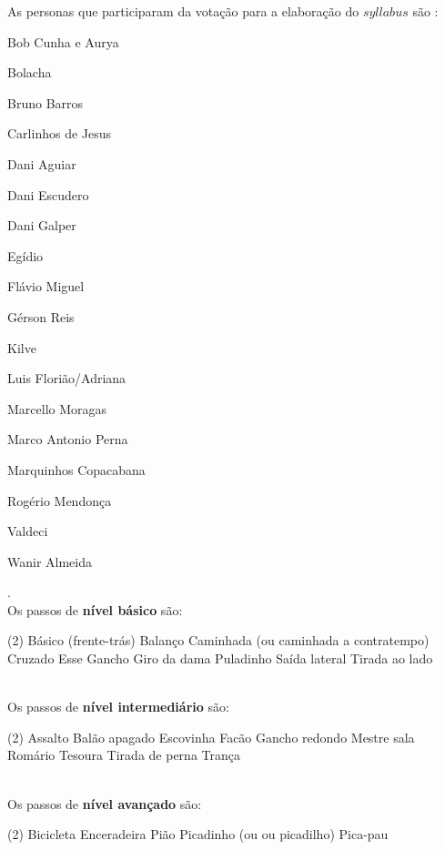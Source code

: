 As personas que participaram da votação para a elaboração do $syllabus$ são \cite[pp. 144]{perna2002samba}:
\begin{inparaitem}[$*$]
\item Bob Cunha e Aurya
\item Bolacha
\item Bruno Barros
\item Carlinhos de Jesus
\item Dani Aguiar
\item Dani Escudero
\item Dani Galper
\item Egídio
\item Flávio Miguel
\item Gérson Reis
\item Kilve
\item Luis Florião/Adriana
\item Marcello Moragas
\item Marco Antonio Perna
\item Marquinhos Copacabana
\item Rogério Mendonça
\item Valdeci
\item Wanir Almeida
\end{inparaitem}.\\



Os passos de \textbf{nível básico} são:
\begin{tasks}(2)
\task Básico (frente-trás)
\task Balanço 
\task Caminhada (ou caminhada a contratempo)
\task Cruzado
\task Esse
\task Gancho
\task Giro da dama
\task Puladinho
\task Saída lateral
\task Tirada ao lado
\end{tasks}~\\


Os passos de \textbf{nível intermediário} são:
\begin{tasks}(2)
\task Assalto
\task Balão apagado
\task Escovinha
\task Facão
\task Gancho redondo
\task Mestre sala
\task Romário
\task Tesoura
\task Tirada de perna
\task Trança
\end{tasks}~\\

Os passos de \textbf{nível avançado} são:
\begin{tasks}(2)
\task Bicicleta
\task Enceradeira
\task Pião
\task Picadinho (ou ou picadilho)
\task Pica-pau
\end{tasks}

